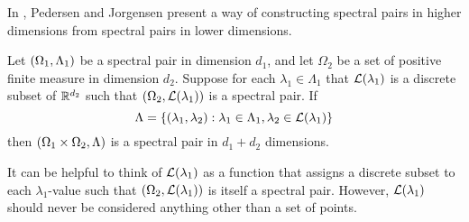 \documentclass[../thesis.tex]{subfiles}
\begin{document}


In \cite{jorgensenSpectralPairsCartesian2001}, Pedersen and Jorgensen present a way of constructing spectral pairs in higher dimensions from spectral pairs in lower dimensions. 

\begin{theorem}\label{thrm:construction_spectra}
    Let $(\Omega_1,\Lambda_1)$ be a spectral pair in dimension $d_1$, and let $\Omega_2$ be a set of positive finite measure in dimension $d_2$. Suppose for each $\lambda_1 \in \Lambda_1$ that $\mathcal{L}(\lambda_1)$ is a discrete subset of $\mathbb{R}^{d_2}$ such that $(\Omega_2,\mathcal{L}(\lambda_1))$ is a spectral pair. If 
    \begin{equation*}
        \Lambda = \{(\lambda_1, \lambda_2): \lambda_1\in \Lambda_1, \lambda_2 \in \mathcal{L}(\lambda_1)\} 
    \end{equation*}
    then $(\Omega_1\times\Omega_2, \Lambda)$ is a spectral pair in $d_1+d_2$ dimensions. 
\end{theorem}

\begin{remark}
    It can be helpful to think of $\mathcal{L}(\lambda_1)$ as a function that assigns a discrete subset to each $\lambda_1$-value such that $(\Omega_2,\mathcal{L}(\lambda_1))$ is itself a spectral pair. However, $\mathcal{L}(\lambda_1)$ should never be considered anything other than a set of points. 
\end{remark}
\end{document}
